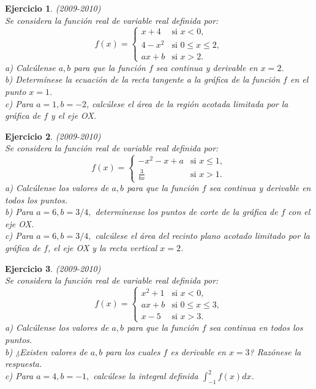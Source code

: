\documentclass[12pt, a4paper]{amsart}
\newtheorem{ejer}{Ejercicio}
\begin{document}
\begin{ejer}\em (2009-2010)\\
Se considera la función real de variable real definida por:
\begin{equation*}
f(x)=\left \{ \begin{matrix} x+4 & \mbox{si } x<0,
\\ 4-x^2 & \mbox{si } 0\leq x\leq 2,
\\ ax+b & \mbox{si } x>2. \end{matrix}\right. 
\end{equation*}
a) Calcúlense $a,b$ para que la función $f$ sea continua y derivable en $x=2$.\\
b) Determínese la ecuación de la recta tangente a la gráfica de la función $f$ en el punto $x=1$.\\
c) Para $a=1,b=-2$, calcúlese el área de la región acotada limitada por la gráfica de $f$ y el eje OX.
\end{ejer}

\begin{ejer}\em (2009-2010)\\%
Se considera la función real de variable real definida por:
\begin{equation*}
f(x)=\left \{ \begin{matrix} -x^2-x+a & \mbox{si } x\leq 1,
\\ \frac{3}{bx} & \mbox{si } x>1. \end{matrix}\right. 
\end{equation*}
a) Calcúlense los valores de $a,b$ para que la función $f$ sea continua y derivable en todos los puntos.\\
b) Para $a=6,b=3/4,$ determínense los puntos de corte de la gráfica de $f$ con el eje OX.\\
c) Para $a=6,b=3/4,$ calcúlese el área del recinto plano acotado limitado por la gráfica de $f$, el eje OX y la recta vertical $x=2$.
\end{ejer}

\begin{ejer}\em (2009-2010)\\%
Se considera la función real de variable real definida por:
\begin{equation*}
f(x)=\left \{ \begin{matrix} x^2+1 & \mbox{si } x<0,
\\ ax+b & \mbox{si } 0\leq x\leq 3,
\\ x-5 & \mbox{si } x>3. \end{matrix}\right. 
\end{equation*}
a) Calcúlense los valores de $a,b$ para que la función $f$ sea continua en todos los puntos.\\
b) ¿Existen valores de  $a,b$ para los cuales $f$ es derivable en $x=3$? Razónese la respuesta.\\
c) Para $a=4,b=-1,$ calcúlese la integral definida $\int_{-1}^2f(x)dx$.
\end{ejer}
\end{document}
